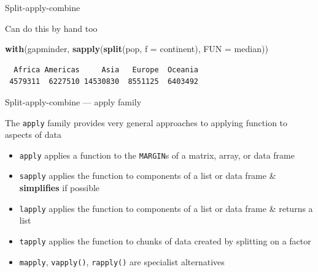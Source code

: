 \documentclass[10pt,ignorenonframetext,compress, aspectratio=169]{beamer}
\newenvironment{Shaded}{\begin{snugshade}}{\end{snugshade}}
\newcommand{\KeywordTok}[1]{\textcolor[rgb]{0.13,0.29,0.53}{\textbf{{#1}}}}
\newcommand{\DataTypeTok}[1]{\textcolor[rgb]{0.13,0.29,0.53}{{#1}}}
\newcommand{\NormalTok}[1]{{#1}}
\begin{document}
\begin{frame}[fragile]{Split-apply-combine}

Can do this by hand too

\scriptsize

\begin{Shaded}
\begin{Highlighting}[]
\KeywordTok{with}\NormalTok{(gapminder, }\KeywordTok{sapply}\NormalTok{(}\KeywordTok{split}\NormalTok{(pop, }\DataTypeTok{f =} \NormalTok{continent), }\DataTypeTok{FUN =} \NormalTok{median)) }
\end{Highlighting}
\end{Shaded}

\begin{verbatim}
  Africa Americas     Asia   Europe  Oceania 
 4579311  6227510 14530830  8551125  6403492 
\end{verbatim}

\normalsize

\end{frame}

\begin{frame}{Split-apply-combine --- apply family}

The \texttt{apply} family provides very general approaches to applying
function to aspects of data

\begin{itemize}
\itemsep1pt\parskip0pt
\item
  \texttt{apply} applies a function to the \texttt{MARGIN}s of a matrix,
  array, or data frame
\item
  \texttt{sapply} applies the function to components of a list or data
  frame \& \textbf{simplifies} if possible
\item
  \texttt{lapply} applies the function to components of a list or data
  frame \& returns a list
\item
  \texttt{tapply} applies the function to chunks of data created by
  splitting on a factor
\item
  \texttt{mapply}, \texttt{vapply()}, \texttt{rapply()} are specialist
  alternatives
\end{itemize}

\end{frame}
\end{document}
